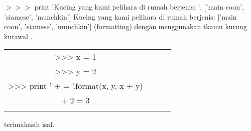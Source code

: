 $>>>$ print 'Kucing yang kami pelihara di rumah berjenis: ', ['main coon', 'siamese', 'munchkin']
Kucing yang kami pelihara di rumah berjenis: ['main coon', 'siamese', 'munchkin']
 (formatting) dengan menggunakan tkamu kurung kurawal {}.


\begin{tabular}{|c|c|c|c|}
\hline

>>> x = 1 \\ \linebreak
>>> y = 2 \\ \linebreak
>>> print '{} + {} = {}'.format(x, y, x + y) \\ \linebreak
1 + 2 = 3 \\ \linebreak

\end{tabular}

terimakasih isal.
